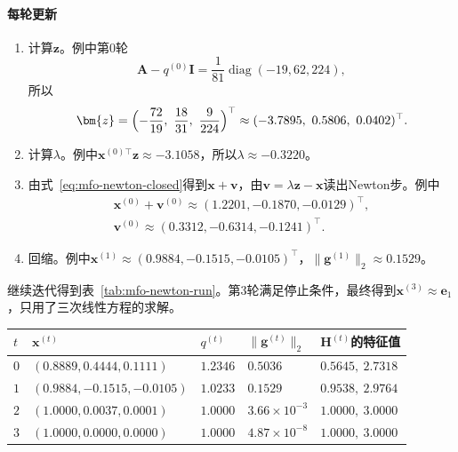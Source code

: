 \paragraph{每轮更新}
\begin{enumerate}
 \item 计算$\bm{z}$。例中第$0$轮
 \[
  \bm{A}-q^{(0)}\bm{I}=\frac{1}{81}\operatorname{diag}(-19,62,224),
 \]
 所以
 \[
  \bm{z}=\Bigl(-\frac{72}{19},\ \frac{18}{31},\ \frac{9}{224}\Bigr)^\top\approx(-3.7895,\ 0.5806,\ 0.0402)^\top.
 \]

 \item 计算$\lambda$。例中$\bm{x}^{(0)\top}\bm{z}\approx-3.1058$，所以$\lambda\approx-0.3220$。

 \item 由式~\eqref{eq:mfo-newton-closed}得到$\bm{x}+\bm{v}$，由$\bm{v}=\lambda\bm{z}-\bm{x}$读出Newton步。例中
 \[
  \begin{gathered}
  \bm{x}^{(0)}+\bm{v}^{(0)}\approx(1.2201,-0.1870,-0.0129)^\top,\\
  \bm{v}^{(0)}\approx(0.3312,-0.6314,-0.1241)^\top.
  \end{gathered}
 \]

 \item 回缩。例中$\bm{x}^{(1)}\approx(0.9884,-0.1515,-0.0105)^\top$，$\lVert\bm{g}^{(1)}\rVert_2\approx0.1529$。
\end{enumerate}

继续迭代得到表~\ref{tab:mfo-newton-run}。第$3$轮满足停止条件，最终得到$\bm{x}^{(3)}\approx\bm{e}_1$，只用了三次线性方程的求解。

\begin{BookInlineTable}
 \centering
 \caption{从$(8,4,1)^\top/9$出发的黎曼Newton法。最后一列是切空间上$\bm{H}^{(t)}$的特征值。}
 \label{tab:mfo-newton-run}
 \begin{tabular}{lllll}
  \toprule
  $t$ & $\bm{x}^{(t)}$ & $q^{(t)}$ & $\lVert\bm{g}^{(t)}\rVert_2$ & $\bm{H}^{(t)}$的特征值\\
  \midrule
  $0$ & $(0.8889,0.4444,0.1111)$ & $1.2346$ & $0.5036$ & $0.5645,\ 2.7318$\\
  $1$ & $(0.9884,-0.1515,-0.0105)$ & $1.0233$ & $0.1529$ & $0.9538,\ 2.9764$\\
  $2$ & $(1.0000,0.0037,0.0001)$ & $1.0000$ & $3.66\times10^{-3}$ & $1.0000,\ 3.0000$\\
  $3$ & $(1.0000,0.0000,0.0000)$ & $1.0000$ & $4.87\times10^{-8}$ & $1.0000,\ 3.0000$\\
  \bottomrule
 \end{tabular}
\end{BookInlineTable}

